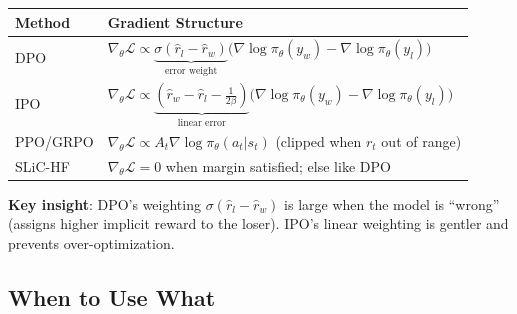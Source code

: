 \begin{center}
    \renewcommand{\arraystretch}{1.8}
    \begin{tabular}{l|l}
        \textbf{Method} & \textbf{Gradient Structure}                                                                                                                                                              \\
        \hline
        DPO             & $\nabla_\theta \mathcal{L} \propto \underbrace{\sigma(\hat{r}_l - \hat{r}_w)}_{\text{error weight}} \bigl(\nabla \log \pi_\theta(y_w) - \nabla \log \pi_\theta(y_l)\bigr)$               \\
        IPO             & $\nabla_\theta \mathcal{L} \propto \underbrace{(\hat{r}_w - \hat{r}_l - \tfrac{1}{2\beta})}_{\text{linear error}} \bigl(\nabla \log \pi_\theta(y_w) - \nabla \log \pi_\theta(y_l)\bigr)$ \\
        PPO/GRPO        & $\nabla_\theta \mathcal{L} \propto A_t \nabla \log \pi_\theta(a_t|s_t)$ \quad (clipped when $r_t$ out of range)                                                                          \\
        SLiC-HF         & $\nabla_\theta \mathcal{L} = 0$ when margin satisfied; else like DPO                                                                                                                     \\
    \end{tabular}
\end{center}

\textbf{Key insight}: DPO's weighting $\sigma(\hat{r}_l - \hat{r}_w)$ is large when the model is ``wrong'' (assigns higher implicit reward to the loser). IPO's linear weighting is gentler and prevents over-optimization.

\subsection{When to Use What}

